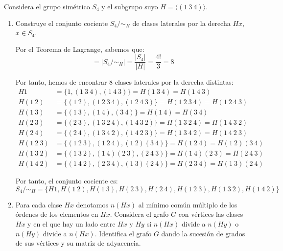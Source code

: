 \begin{ejercicio}
    \label{ej:1.41}
    Considera el grupo simétrico $S_4$ y el subgrupo suyo $H = \langle (1\ 3\ 4) \rangle$.
    \begin{enumerate}
        \item Construye el conjunto cociente $S_4/\sim_H$ de clases laterales por la derecha $Hx$, $x \in S_4$.
        
        Por el Teorema de Lagrange, sabemos que:
        \begin{equation*}
            [S_4:H]=\left|S_4/\sim_H\right|=\frac{|S_4|}{|H|}=\frac{4!}{3}=8
        \end{equation*}

        Por tanto, hemos de encontrar 8 clases laterales por la derecha distintas:
        \begin{align*}
            H1 &= \{1, (1\ 3\ 4), (1\ 4\ 3)\} = H(1\ 3\ 4) = H(1\ 4\ 3)\\
            H(1\ 2) &= \{(1\ 2), (1\ 2\ 3\ 4), (1\ 2\ 4\ 3)\} = H(1\ 2\ 3\ 4) = H(1\ 2\ 4\ 3)\\
            H(1\ 3) &= \{(1\ 3), (1\ 4), (3\ 4)\} = H(1\ 4) = H(3\ 4)\\
            H(2\ 3) &= \{(2\ 3), (1\ 3\ 2\ 4), (1\ 4\ 3\ 2)\} = H(1\ 3\ 2\ 4) = H(1\ 4\ 3\ 2)\\
            H(2\ 4) &= \{(2\ 4), (1\ 3\ 4\ 2), (1\ 4\ 2\ 3)\} = H(1\ 3\ 4\ 2) = H(1\ 4\ 2\ 3)\\
            H(1\ 2\ 3) &= \{(1\ 2\ 3), (1\ 2\ 4), (1\ 2)(3\ 4)\} = H(1\ 2\ 4) = H(1\ 2)(3\ 4)\\
            H(1\ 3\ 2) &= \{(1\ 3\ 2), (1\ 4)(2\ 3), (2\ 4\ 3)\} = H(1\ 4)(2\ 3) = H(2\ 4\ 3)\\
            H(1\ 4\ 2) &= \{(1\ 4\ 2), (2\ 3\ 4), (1\ 3)(2\ 4)\} = H(2\ 3\ 4) = H(1\ 3)(2\ 4)
        \end{align*}

        Por tanto, el conjunto cociente es:
        \begin{equation*}
            S_4/\sim_H=\{H1, H(1\ 2), H(1\ 3), H(2\ 3), H(2\ 4), H(1\ 2\ 3), H(1\ 3\ 2), H(1\ 4\ 2)\}
        \end{equation*}

        \item Para cada clase $Hx$ denotamos $n(Hx)$ al mínimo común múltiplo de los órdenes de los elementos en $Hx$. Considera el grafo $G$ con vértices las clases $Hx$ y en el que hay un lado entre $Hx$ y $Hy$ si $n(Hx)$ divide a $n(Hy)$ o $n(Hy)$ divide a $n(Hx)$. Identifica el grafo $G$ dando la sucesión de grados de sus vértices y su matriz de adyacencia.
        

\end{enumerate}
\end{ejercicio}
